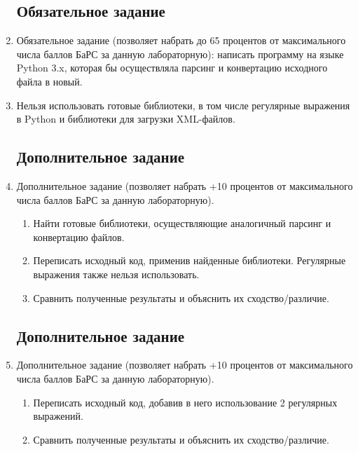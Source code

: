 \begin{enumerate}
            \subsection{Обязательное задание}
      \item  Обязательное задание (позволяет набрать до 65 процентов от
            максимального числа баллов БаРС за данную лабораторную):
            написать программу на языке Python 3.x, которая бы осуществляла
            парсинг и конвертацию исходного файла в новый.
      \item  Нельзя использовать готовые библиотеки, в том числе регулярные
            выражения в Python и библиотеки для загрузки XML-файлов.
            \lstset{language=Python}
            \lstset{language=XML}
            
            \subsection{Дополнительное задание }
      \item  Дополнительное задание  (позволяет набрать +10
            процентов от максимального числа баллов БаРС за данную
            лабораторную).
            \begin{enumerate}
                  \item Найти готовые библиотеки, осуществляющие аналогичный
                        парсинг и конвертацию файлов.
                  \item Переписать исходный код, применив найденные
                        библиотеки. Регулярные выражения также нельзя
                        использовать.
                  \item Сравнить полученные результаты и объяснить их
                        сходство/различие.
            \end{enumerate}
            
            \lstset{language=Python}
            \lstset{language=XML}
            
            \subsection{Дополнительное задание }
      \item Дополнительное задание  (позволяет набрать +10
            процентов от максимального числа баллов БаРС за данную
            лабораторную).
            \begin{enumerate}
                  \item Переписать исходный код, добавив в него использование
                        2
                        регулярных выражений.
                  \item Сравнить полученные результаты и объяснить их
                        сходство/различие.
            \end{enumerate}
            

\end{enumerate}

